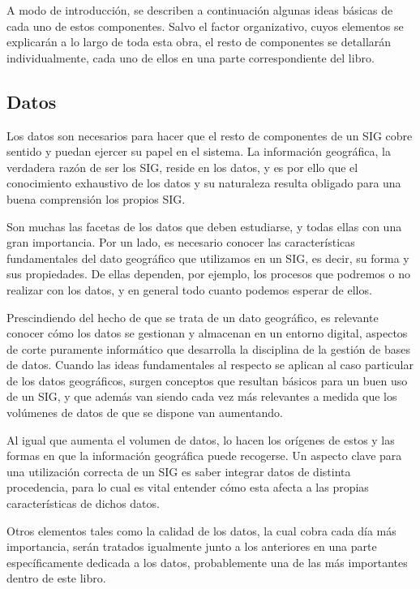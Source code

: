 A modo de introducción, se describen a continuación algunas ideas básicas de cada uno de estos componentes. Salvo el factor organizativo, cuyos elementos se explicarán a lo largo de toda esta obra, el resto de componentes se detallarán individualmente, cada uno de ellos en una parte correspondiente del libro.


\subsection{Datos}

Los datos son necesarios para hacer que el resto de componentes de un SIG cobre sentido y puedan ejercer su papel en el sistema. La información geográfica, la verdadera razón de ser los SIG, reside en los datos, y es por ello que el conocimiento exhaustivo de los datos y su naturaleza resulta obligado para una buena comprensión los propios SIG.

Son muchas las facetas de los datos que deben estudiarse, y todas ellas con una gran importancia. Por un lado, es necesario conocer las características fundamentales del dato geográfico que utilizamos en un SIG, es decir, su forma y sus propiedades. De ellas dependen, por ejemplo, los procesos que podremos o no realizar con los datos, y en general todo cuanto podemos esperar de ellos.

Prescindiendo del hecho de que se trata de un dato geográfico, es relevante conocer cómo los datos se gestionan y almacenan en un entorno digital, aspectos de corte puramente informático que desarrolla la disciplina de la gestión de bases de datos. Cuando las ideas fundamentales al respecto se aplican al caso particular de los datos geográficos, surgen conceptos que resultan básicos para un buen uso de un SIG, y que además van siendo cada vez más relevantes a medida que los volúmenes de datos de que se dispone van aumentando. 

Al igual que aumenta el volumen de datos, lo hacen los orígenes de estos y las formas en que la información geográfica puede recogerse. Un aspecto clave para una utilización correcta de un SIG es saber integrar datos de distinta procedencia, para lo cual es vital entender cómo esta afecta a las propias características de dichos datos.

Otros elementos tales como la calidad de los datos, la cual cobra cada día más importancia, serán tratados igualmente junto a los anteriores en una parte específicamente dedicada a los datos, probablemente una de las más importantes dentro de este libro.

